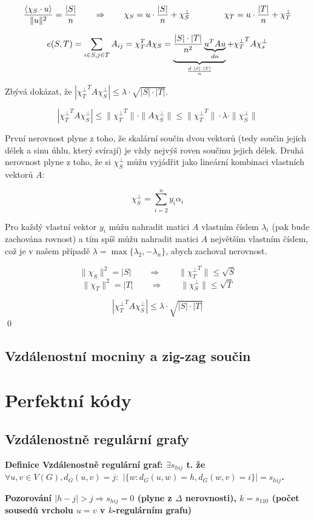 \documentclass[a4paper,12pt,titlepage]{article}
\newcommand{\df}{\smallskip\noindent\bf Definice\rm{} }
\newcommand{\poz}{\smallskip\noindent\bf Pozorování\rm{} }
\newcommand{\xttt}{{\chi_T^\bot}^T}
\newcommand{\sk}[1]{\langle #1\rangle}
\begin{document}
$${\sk{\chi_S \cdot u} \over \|u\|^2} = {|S|\over n} \qquad\Rightarrow\qquad \chi_S = u\cdot {|S|\over n} + \chi_S^\bot \qquad\qquad \chi_T = u\cdot {|T|\over n} + \chi_T^\bot$$

$$e(S,T) = \sum_{i\in S, j\in T} A_{ij} = \chi_T^TA\chi_S = \underbrace{{|S|\cdot |T| \over n^2} \underbrace{u^TAu}_{dn}}_{d\cdot |S|\cdot |T|\over n} + \xttt A\chi_s^\bot$$

Zbývá dokázat, že $|\xttt A\chi_S^\bot| \le \lambda\cdot\sqrt{|S|\cdot |T|}$.

$$|\xttt A\chi_S^\bot| \le \|\xttt \| \cdot \|A\chi_S^\bot\| \le \|\xttt\|\cdot\lambda\cdot\|\chi_S^\bot\|$$

První nerovnost plyne z toho, že skalární součin dvou vektorů (tedy součin
jejich délek a sinu úhlu, který svírají) je vždy nejvýš roven součinu jejich
délek. Druhá nerovnost plyne z toho, že si $\chi_S^\bot$ můžu vyjádřit jako
lineární kombinaci vlastních vektorů $A$:

$$\chi_S^\bot = \sum_{i=2}^n y_i\alpha_i$$

Pro každý vlastní vektor $y_i$ můžu nahradit matici $A$ vlastním číslem
$\lambda_i$ (pak bude zachována rovnost) a tím spíš můžu nahradit matici $A$
největším vlastním číslem, což je v našem případě $\lambda =
\max\{\lambda_2,-\lambda_n\}$, abych zachoval nerovnost.

$$\|\chi_S\|^2 = |S| \qquad\Rightarrow\qquad \|\xttt\| \le \sqrt S$$
$$\|\chi_T\|^2 = |T| \qquad\Rightarrow\qquad \|\chi_S^\bot\| \le \sqrt T$$

$$|\xttt A\chi_S^\bot| \le \lambda\cdot\sqrt{|S|\cdot |T|}$$
\qed


\subsection{Vzdálenostní mocniny a zig-zag součin}

\section{Perfektní kódy}
\subsection{Vzdálenostně regulární grafy}

\df Vzdálenostně regulární graf: $\exists s_{hij}$ t. že $\forall u,v\in V(G), d_G(u,v) = j:$ $|\{w: d_G(u,w) = h, d_G(w,v) = i\}| = s_{hij}$.

\poz $|h-j| > j \Rightarrow s_{hij} = 0$ (plyne z $\Delta$ nerovnosti), $k = s_{110}$ (počet sousedů vrcholu $u = v$ v $k$-regulárním grafu)
\end{document}
